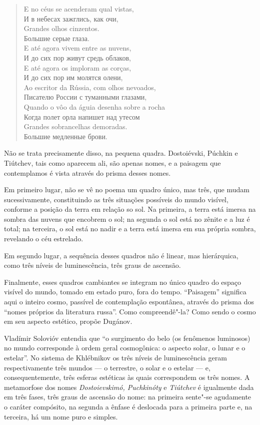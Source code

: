 {\begin{verse}
E no céus se acenderam qual vistas, \\
И в небесах зажглись, как очи, \\[8pt]
Grandes olhos cinzentos. \\
Большие серые глаза. \\[8pt]
E até agora vivem entre as nuvens, \\
И до сих пор живут средь облаков, \\[8pt]
E até agora os imploram as corças, \\
И до сих пор им молятся олени, \\[8pt]
Ao escritor da Rússia, com olhos nevoados, \\
Писателю России с туманными глазами, \\[8pt]
Quando o vôo da águia desenha sobre a \qb{}rocha \\
Когда полет орла напишет над утесом \\[8pt]
Grandes sobrancelhas demoradas. \\
Большие медленные брови.
\end{verse}

Não se trata precisamente disso, na pequena quadra. Dostoiévski, Púchkin
e Tiútchev, tais como aparecem ali, são apenas nomes, e a paisagem que
contemplamos é vista através do prisma desses nomes.

Em primeiro lugar, não se vê no poema um quadro único, mas três, que
mudam sucessivamente, constituindo as três situações possíveis do mundo
visível, conforme a posição da terra em relação so sol. Na primeira, a
terra está imersa na sombra das nuvens que encobrem o sol; na segunda o
sol está no zênite e a luz é total; na terceira, o sol está no nadir e a
terra está imersa em sua própria sombra, revelando o céu estrelado.

Em segundo lugar, a sequência desses quadros não é linear, mas
hierárquica, como três níveis de luminescência, três graus de ascensão.

Finalmente, esses quadros cambiantes se integram no único quadro do
espaço visível do mundo, tomado em estado puro, fora do tempo.
``Paisagem'' significa aqui o inteiro cosmo, passível de contemplação
espontânea, através do prisma dos ``nomes próprios da literatura russa''.
Como compreendê"-la? Como sendo o cosmo em seu aspecto estético, propõe
Dugánov.

Vladímir Solovióv entendia que ``o surgimento do belo (os fenômenos
luminosos) no mundo corresponde à ordem geral cosmogônica: o aspecto
solar, o lunar e o estelar''. No sistema de Khlébnikov os três níveis de
luminescência geram respectivamente três mundos --- o terrestre, o solar
e o estelar --- e, consequentemente, três esferas estéticas às quais
correspondem os três nomes. A metamorfose dos nomes \emph{Dostoievskimó, 
Puchkinóty} e \emph{Tiútchev} é igualmente dada em três fases, três
graus de ascensão do nome: na primeira sente"-se agudamente o caráter
compósito, na segunda a ênfase é deslocada para a primeira parte e, na
terceira, há um nome puro e simples.

}
